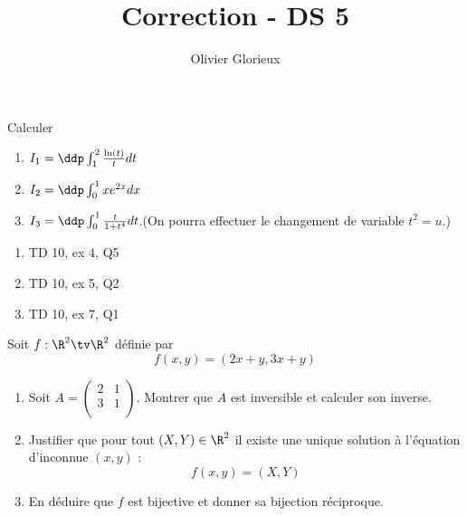 \documentclass[a4paper, 11pt,reqno]{article}
\author{Olivier Glorieux}
\begin{document}
\title{Correction - DS 5
}
\begin{exercice}
Calculer
\begin{enumerate}
\item  $I_1=\ddp\int_1^2 \frac{\ln(t)}{t}dt$
\item $I_2 =\ddp \int_0^1 xe^{2x}dx$
\item $I_3 =\ddp\int_0^1 \frac{t}{1+t^4}dt$.\quad   (On pourra effectuer le changement de variable $t^2=u$.)
\end{enumerate}
\end{exercice}

\begin{correction}
\begin{enumerate}
\item  TD 10, ex 4, Q5
\item  TD 10, ex 5, Q2
\item  TD 10, ex 7, Q1
\end{enumerate}
\end{correction}
\vspace{0.5cm}

\begin{exercice}
Soit $f  : \R^2 \tv \R^2 $ définie par 
$$f(x,y)=(2x+y,  3x+y)$$

\begin{enumerate}
\item Soit $A = \begin{pmatrix}
2 & 1\\
3 & 1\\
\end{pmatrix}$. Montrer que $A$ est inversible et calculer son inverse. 

\item Justifier que pour tout $(X,Y)\in \R^2$ il existe une unique solution à l'équation d'inconnue $(x,y)$ : $$f(x,y)=(X,Y)$$
\item En déduire que $f$ est bijective et donner sa bijection réciproque. 
\end{enumerate}

\end{exercice}
\end{document}
